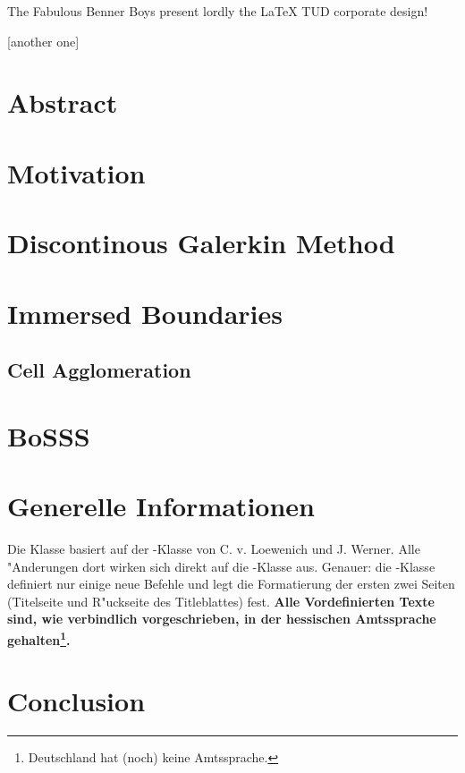 \documentclass[article,dr=phil,type=drfinal,colorback,accentcolor=tud2a]{tudthesis}
\begin{document}
    {The Fabulous Benner Boys present lordly the {\LaTeX} TUD corporate design!}
  \author{Simone Katharina Stange}
  [another one]
  \dateofexam{\today}{\today}
  \makethesistitle
  
  \tableofcontents
  \newpage
  \listoffigures
  \newpage
	
  \section{Abstract}
  \section{Motivation}
  \section{Discontinous Galerkin Method}
  \section{Immersed Boundaries}
    \subsection{Cell Agglomeration}
  \section{BoSSS}
  \section{Generelle Informationen}
    Die Klasse basiert auf der -Klasse von C. v. Loewenich und
    J. Werner. Alle "Anderungen dort wirken sich direkt auf die
    -Klasse aus. Genauer: die -Klasse definiert nur einige
    neue Befehle und legt die Formatierung der ersten zwei Seiten (Titelseite
    und R"uckseite des Titleblattes) fest. \textbf{Alle Vordefinierten Texte sind, wie verbindlich vorgeschrieben, in der hessischen Amtssprache
    gehalten\footnote{Deutschland hat (noch) keine Amtssprache.}.}
  \section{Conclusion}
  
\end{document}
